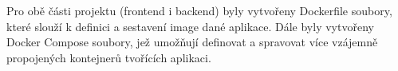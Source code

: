 Pro obě části projektu (frontend i backend) byly vytvořeny Dockerfile soubory, které slouží k definici a sestavení image dané aplikace. Dále byly vytvořeny Docker Compose soubory, jež umožňují definovat a spravovat více vzájemně propojených kontejnerů tvořících aplikaci. \cite{theserverside_dockerfile_vs_compose}